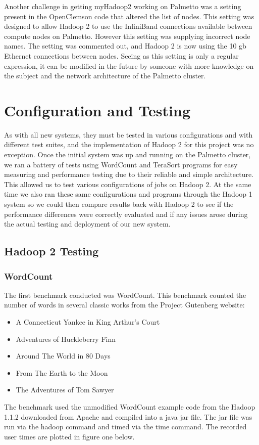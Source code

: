 \documentclass[conference]{IEEEtran}
\begin{document}
                Another challenge in getting myHadoop2 working on Palmetto was a setting present in the OpenClemson code that altered the list of nodes. This setting was designed to allow Hadoop 2 to use the InfiniBand connections available between compute nodes on Palmetto. However this setting was supplying incorrect node names. The setting was commented out, and Hadoop 2 is now using the 10 gb Ethernet connections between nodes. Seeing as this setting is only a regular expression, it can be modified in the future by someone with more knowledge on the subject and the network architecture of the Palmetto cluster.


		\section{Configuration and Testing}
			As with all new systems, they must be tested in various configurations and with different test suites, and the implementation of Hadoop 2 for this project was no exception. Once the initial system was up and running on the Palmetto cluster, we ran a battery of tests using WordCount and TeraSort programs for easy measuring and performance testing due to their reliable and simple architecture. This allowed us to test various configurations of jobs on Hadoop 2. At the same time we also ran these same configurations and programs through the Hadoop 1 system so we could then compare results back with Hadoop 2 to see if the performance differences were correctly evaluated and if any issues arose during the actual testing and deployment of our new system.

			\subsection{Hadoop 2 Testing}
               			\subsubsection{WordCount}
                    				The first benchmark conducted was WordCount. This benchmark counted the number of words in several classic works from the Project Gutenberg website\cite{gutenburg}:
                    				\begin{itemize}
                    				 	\item A Connecticut Yankee in King Arthur's Court\cite{yankee}
                        					\item Adventures of Huckleberry Finn\cite{huck}
                        					\item Around The World in 80 Days\cite{80days}
                      					\item From The Earth to the Moon\cite{moon}
                     					\item The Adventures of Tom Sawyer\cite{tom}
                  				\end{itemize}
						The benchmark used the unmodified WordCount example code from the Hadoop 1.1.2 downloaded from Apache and compiled into a java jar file. The jar file was run via the hadoop command and timed via the time command. The recorded user times are plotted in figure one below.
		
\end{document}
